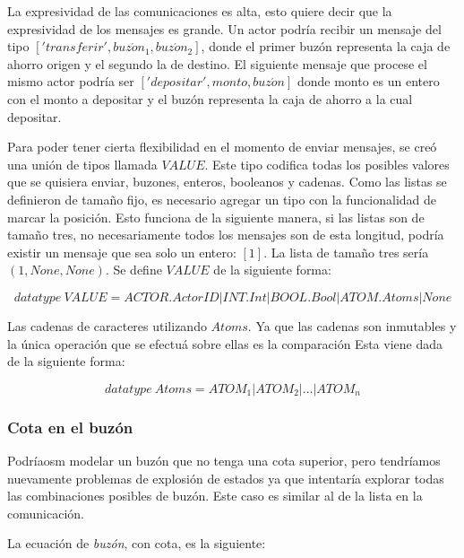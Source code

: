 La expresividad de las comunicaciones es alta, esto quiere decir que la expresividad de los mensajes es grande. Un actor podría recibir un mensaje del tipo $['transferir', buz\acute{o}n_1, buz\acute{o}n_2]$, donde el primer buzón representa la caja de ahorro origen y el segundo la de destino. El siguiente mensaje que procese el mismo actor podría ser $['depositar', monto, buz\acute{o}n]$ donde monto es un entero con el monto a depositar y el buzón representa la caja de ahorro a la cual depositar. 

Para poder tener cierta flexibilidad en el momento de enviar mensajes, se creó una unión de tipos llamada $VALUE$. Este tipo codifica todas los posibles valores que se quisiera enviar, buzones, enteros, booleanos y cadenas. Como las listas se definieron de tamaño fijo, es necesario agregar un tipo con la funcionalidad de marcar la posición. Esto funciona de la siguiente manera, si las listas son de tamaño tres, no necesariamente todos los mensajes son de esta longitud, podría existir un mensaje que sea solo un entero: $[1]$. La lista de tamaño tres sería $(1, None, None)$. Se define $VALUE$ de la siguiente forma:

\[
  datatype\ VALUE = ACTOR.ActorID | INT.Int | BOOL.Bool | ATOM.Atoms | None
\]

Las cadenas de caracteres utilizando $Atoms$. Ya que las cadenas son inmutables y la única operación que se efectuá sobre ellas es la comparación Esta viene dada de la siguiente forma:

\[
  datatype\ Atoms = ATOM_1 | ATOM_2 | \ldots | ATOM_n
\]

\subsubsection*{Cota en el buzón}

Podríaosm modelar un buzón que no tenga una cota superior, pero tendríamos nuevamente problemas de explosión de estados ya que \FDR intentaría explorar todas las combinaciones posibles de buzón. Este caso es similar al de la lista en la comunicación. 

La ecuación de \textit{buzón}, con cota, es la siguiente:

